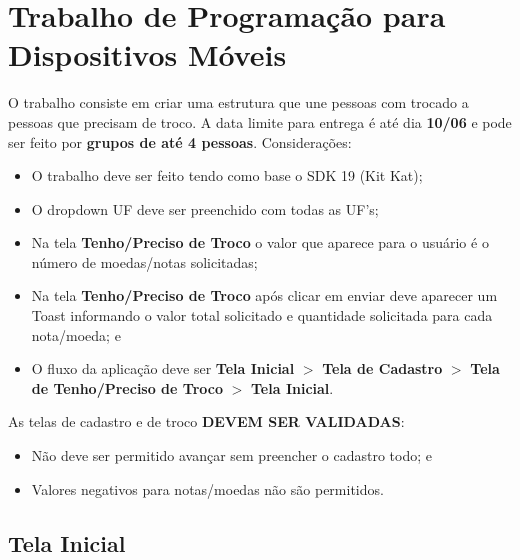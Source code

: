 \documentclass[a4paper,10pt]{article}
\begin{document}
\section*{Trabalho de Programação para Dispositivos Móveis}

O trabalho consiste em criar uma estrutura que une pessoas com trocado a pessoas que precisam de troco. A data limite para entrega é até dia \textbf{10/06} e pode ser feito por \textbf{grupos de até 4 pessoas}.
Considerações:
\begin{itemize}
  \item O trabalho deve ser feito tendo como base o SDK 19 (Kit Kat);
  \item O dropdown UF deve ser preenchido com todas as UF's;
  \item Na tela \textbf{Tenho/Preciso de Troco} o valor que aparece para o usuário é o número de moedas/notas solicitadas;
  \item Na tela \textbf{Tenho/Preciso de Troco} após clicar em enviar deve aparecer um Toast informando o valor total solicitado e quantidade solicitada para cada nota/moeda; e
  \item O fluxo da aplicação deve ser \textbf{Tela Inicial} $>$ \textbf{Tela de Cadastro} $>$ \textbf{Tela de Tenho/Preciso de Troco} $>$ \textbf{Tela Inicial}.
\end{itemize}

As telas de cadastro e de troco \textbf{DEVEM SER VALIDADAS}:
\begin{itemize}
 \item Não deve ser permitido avançar sem preencher o cadastro todo; e
 \item Valores negativos para notas/moedas não são permitidos.
\end{itemize}

\newpage

\subsection*{Tela Inicial}
\end{document}
